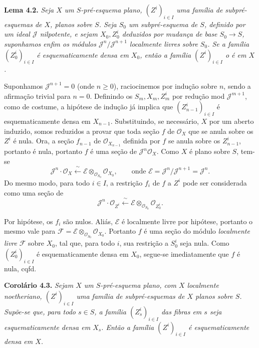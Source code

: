 \medskip
\noindent{}\textbf{Lema 4.2.}
\textit{Seja \(X\) um \(S\)-pré-esquema plano, \((Z^i)_{i\in I}\)
uma família de subpré-esquemas de \(X\), planos sobre \(S\).
Seja \(S_0\) um subpré-esquema de \(S\), definido por um ideal
\(\mathscr J\) nilpotente, e sejam \(X_0,Z^i_0\) deduzidos por
mudança de base \(S_0\to S\), suponhamos enfim os módulos
\(\mathscr J^n/\mathscr J^{n+1}\) localmente livres sobre \(S_0\).
Se a família \((Z^i_0)_{i\in I}\) é esquematicamente densa em
\(X_0\), então a família \((Z^i)_{i\in I}\) o é em \(X\).}

Suponhamos \(\mathscr J^{n+1}=0\) (onde \(n\geq0\)), raciocinemos
por indução sobre \(n\), sendo a afirmação trivial para \(n=0\).
Definindo os \(S_m,X_m,Z^i_m\) por redução mod
\(\mathscr J^{m+1}\), como de costume, a hipótese de indução já
implica que \((Z^i_{n-1})_{i\in I}\) é esquematicamente densa em
\(X_{n-1}\). Substituindo, se necessário, \(X\) por um aberto
induzido, somos reduzidos a provar que toda seção \(f\) de
\(\mathscr O_X\) que se anula sobre os \(Z^i\) é nula. Ora, a
seção \(f_{n-1}\) de \(\mathscr O_{X_{n-1}}\) definida por \(f\)
se anula sobre os \(Z^i_{n-1}\), portanto é nula, portanto \(f\)
é uma seção de \(\mathscr J^n\mathscr O_X\). Como \(X\) é plano
sobre \(S\), tem-se
\[
  \mathscr J^n\cdot\mathscr O_X
  \xleftarrow{\ \sim\ }
  \mathscr E\otimes_{\mathscr O_{S_0}}\mathscr O_{X_0},
  \qquad\text{onde }\mathscr E=\mathscr J^n/\mathscr J^{n+1}=\mathscr J^n.
\]
Do mesmo modo, para todo \(i\in I\), a restrição \(f_i\) de
\(f\) a \(Z^i\) pode ser considerada como uma seção de
\[
  \mathscr J^n\cdot\mathscr O_{Z^i}
  \xleftarrow{\ \sim\ }
  \mathscr E\otimes_{\mathscr O_{S_0}}\mathscr O_{Z^i_0}.
\]

Por hipótese, os \(f_i\) são nulos. Aliás, \(\mathscr E\) é
localmente livre por hipótese, portanto o mesmo vale para
\(\mathscr F=\mathscr E\otimes_{\mathscr O_{S_0}}\mathscr O_{X_0}\).
Portanto \(f\) é uma seção do módulo \emph{localmente livre}
\(\mathscr F\) sobre \(X_0\), tal que, para todo \(i\), sua
restrição a \(S^i_0\) seja nula. Como \((Z^i_0)_{i\in I}\) é
esquematicamente densa em \(X_0\), segue-se imediatamente que
\(f\) é nula, cqfd.

\medskip
\noindent{}\textbf{Corolário 4.3.}
\textit{Sejam \(X\) um \(S\)-pré-esquema plano, com \(X\)
localmente noetheriano, \((Z^i)_{i\in I}\) uma família de
subpré-esquemas de \(X\) planos sobre \(S\). Supõe-se que, para
todo \(s\in S\), a família \((Z^i_s)_{i\in I}\) das fibras em
\(s\) seja esquematicamente densa em \(X_s\). Então a família
\((Z^i)_{i\in I}\) é esquematicamente densa em \(X\).}

